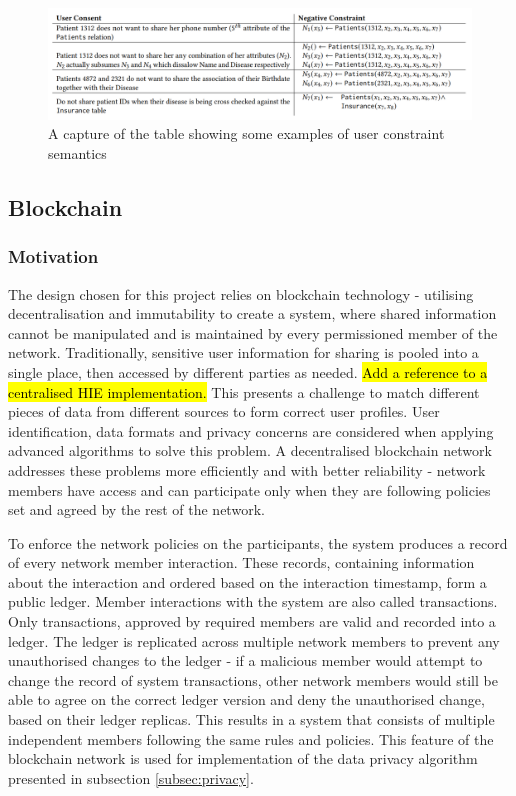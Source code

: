 \documentclass[12pt]{article}
\begin{document}
    \begin{figure}[H]
        \includegraphics[width=\textwidth]{constraints.png}
        \caption{A capture of the table showing some examples of user constraint semantics}
        \label{fig:constraints}
    \end{figure}

    

    \subsection{Blockchain}
    \subsubsection{Motivation}
    The design chosen for this project relies on blockchain technology - utilising decentralisation and immutability to create a system, where shared information cannot be manipulated and is maintained by every permissioned member of the network. Traditionally, sensitive user information for sharing is pooled into a single place, then accessed by different parties as needed. \hl{Add a reference to a centralised HIE implementation.} This presents a challenge to match different pieces of data from different sources to form correct user profiles. User identification, data formats and privacy concerns are considered when applying advanced algorithms to solve this problem. A decentralised blockchain network addresses these problems more efficiently and with better reliability - network members have access and can participate only when they are following policies set and agreed by the rest of the network.

    To enforce the network policies on the participants, the system produces a record of every network member interaction. These records, containing information about the interaction and ordered based on the interaction timestamp, form a public ledger. Member interactions with the system are also called transactions. Only transactions, approved by required members are valid and recorded into a ledger. The ledger is replicated across multiple network members to prevent any unauthorised changes to the ledger - if a malicious member would attempt to change the record of system transactions, other network members would still be able to agree on the correct ledger version and deny the unauthorised change, based on their ledger replicas. This results in a system that consists of multiple independent members following the same rules and policies. This feature of the blockchain network is used for implementation of the data privacy algorithm presented in subsection \ref{subsec:privacy}.
\end{document}
